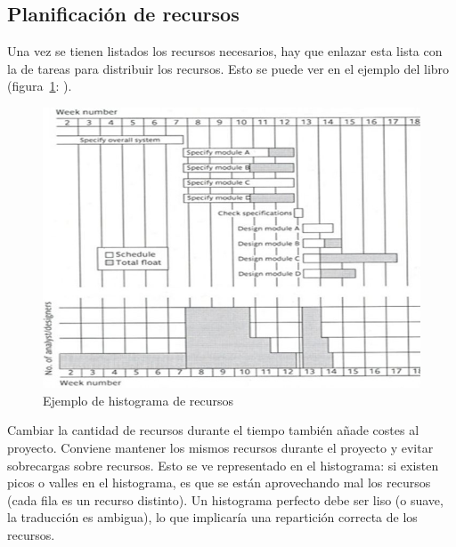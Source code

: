 \documentclass[12pt]{article}
\begin{document}
\newpage
\subsection{Planificación de recursos}
\label{8.4.0}

{Una vez se tienen listados los recursos necesarios, hay que enlazar esta lista con la de tareas para distribuir los recursos. Esto se puede ver en el ejemplo del libro (figura~\ref{fig:8.1}: ).}

\begin{figure} [ht]
    \centering
    \includegraphics[keepaspectratio=true, scale=0.50]{images/Histograma_y_actividades.jpg}
    \caption{Ejemplo de histograma de recursos}
    \label{fig:8.1}
\end{figure}

{Cambiar la cantidad de recursos durante el tiempo también añade costes al proyecto. Conviene mantener los mismos recursos durante el proyecto y evitar sobrecargas sobre recursos. Esto se ve representado en el histograma: si existen picos o valles en el histograma, es que se están aprovechando mal los recursos (cada fila es un recurso distinto). Un histograma perfecto debe ser liso (o suave, la traducción es ambigua), lo que implicaría una repartición correcta de los recursos.}
\end{document}
